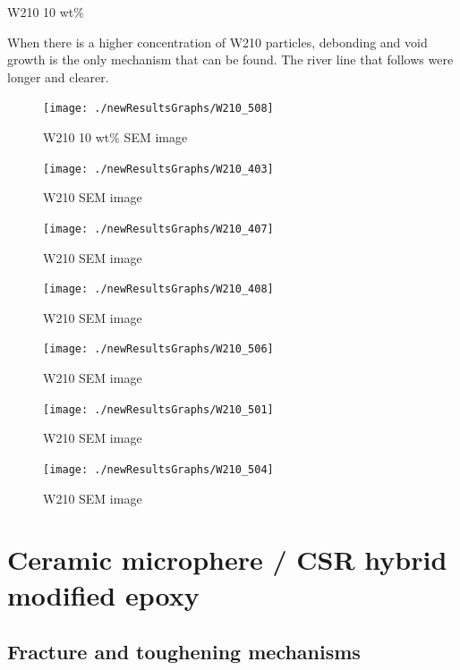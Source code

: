 \documentclass[numbers=noendperiod,chapterprefix=on]{icldt} %
\begin{document}
W210 10 wt\%

When there is a higher concentration of W210 particles, debonding and void growth is the only mechanism that can be found. The river line that follows were longer and clearer. 

\begin{figure}[!hp]
\centering
\texttt{[image: ./newResultsGraphs/W210\_508]}
\caption{W210 10 wt\% SEM image} \label{W210_508}
\end{figure}
\FloatBarrier

\begin{figure}[!hp]
\centering
\texttt{[image: ./newResultsGraphs/W210\_403]}
\caption{W210 SEM image} \label{W210_403}
\end{figure}
\FloatBarrier

\begin{figure}[!hp]
\centering
\texttt{[image: ./newResultsGraphs/W210\_407]}
\caption{W210 SEM image} \label{W210_407}
\end{figure}
\FloatBarrier

\begin{figure}[!hp]
\centering
\texttt{[image: ./newResultsGraphs/W210\_408]}
\caption{W210 SEM image} \label{W210_408}
\end{figure}
\FloatBarrier

\begin{figure}[!hp]
\centering
\texttt{[image: ./newResultsGraphs/W210\_506]}
\caption{W210 SEM image} \label{W210_506}
\end{figure}
\FloatBarrier

\begin{figure}[!hp]
\centering
\texttt{[image: ./newResultsGraphs/W210\_501]}
\caption{W210 SEM image} \label{W210_501}
\end{figure}
\FloatBarrier

\begin{figure}[!hp]
\centering
\texttt{[image: ./newResultsGraphs/W210\_504]}
\caption{W210 SEM image} \label{W210_504}
\end{figure}
\FloatBarrier


\section{Ceramic microphere / CSR hybrid modified epoxy} \label{Hybrid_W210_SEM}

\subsection{Fracture and toughening mechanisms}
\end{document}
